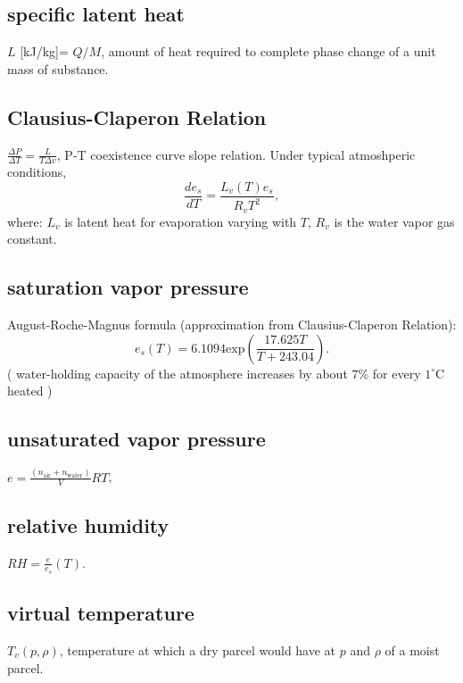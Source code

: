 \subsection{specific latent heat}
\begin{defn*} $L$ [kJ/kg]= $Q/M$, amount of heat required to complete phase change of a unit
mass of substance.
\end{defn*}

\subsection{Clausius-Claperon Relation}
\begin{defn*} $\frac{\Delta P}{\Delta T} = \frac{L}{T\Delta v}$, P-T coexistence curve slope
relation. Under typical atmoshperic conditions, 
\begin{equation}
   \frac{d e_s}{dT} = \frac{L_v(T)e_s}{R_vT^2}, 
\end{equation}
where: $L_v$ is latent heat for evaporation varying with $T$, $R_v$ is the water vapor gas constant.
\end{defn*}


\subsection{saturation vapor pressure}
August-Roche-Magnus formula (approximation from Clausius-Claperon Relation): \\
\begin{equation}
   e_s(T) = 6.1094 \text{exp}(\frac{17.625T}{T+243.04}).
\end{equation}
( water-holding capacity of the atmosphere increases by about $7\%$ for every $1^{\circ}$C heated )

\subsection{unsaturated vapor pressure}
\begin{defn*} $e = \frac{(n_{\text{air}} + n_{\text{water}})}{V}RT$, 
\end{defn*}

\subsection{relative humidity}
\begin{defn*} $RH = \frac{e}{e_s}(T)$.
\end{defn*}

\subsection{virtual temperature}
\begin{defn*} $T_v(p,\rho)$, temperature at which a dry parcel would have at $p$ and $\rho$ of a
moist parcel. \\
\end{defn*}



